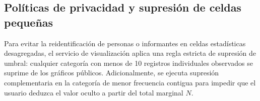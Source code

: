 \subsection{Políticas de privacidad y supresión de celdas pequeñas}
Para evitar la reidentificación de personas o informantes en celdas estadísticas desagregadas, el servicio de visualización aplica una regla estricta de supresión de umbral: cualquier categoría con menos de 10 registros individuales observados se suprime de los gráficos públicos. Adicionalmente, se ejecuta supresión complementaria en la categoría de menor frecuencia contigua para impedir que el usuario deduzca el valor oculto a partir del total marginal $N$.
